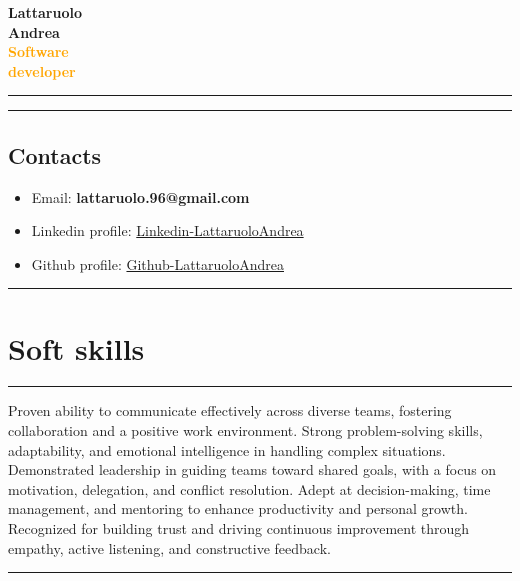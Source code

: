 \documentclass[a4paper,10pt]{article}
\begin{document}
\thispagestyle{empty} %

\noindent
\begin{minipage}[t]{0.25\textwidth}
    \vspace{0.3cm}
    { \LARGE  \textbf{Lattaruolo \\[0.1cm] Andrea \\[0.1cm] \textcolor{orange}{\newline Software \\[0.1cm] developer}}} \\
    \rule{0.6cm}{0.3mm}
\end{minipage}
\hfill
\begin{minipage}[t]{0.75\textwidth}
    \rule{\linewidth}{0.5mm} %
    \subsection*{Contacts}
    \begin{itemize}[leftmargin=1cm]
        \item Email: \textbf{lattaruolo.96@gmail.com}
        \item Linkedin profile: \href{https://github.com/LattaruoloAndrea}{Linkedin-LattaruoloAndrea} 
        \item Github profile: \href{https://github.com/LattaruoloAndrea}{Github-LattaruoloAndrea} 
    \end{itemize}
    \vspace{0.8cm}
    \rule{\linewidth}{0.5mm}
\end{minipage}

\begin{minipage}[t]{0.25\textwidth}
    \section*{Soft skills}
    \vspace{2.8cm} %
    \rule{0.6cm}{0.3mm}
\end{minipage}
\hfill
\begin{minipage}[t]{0.75\textwidth}
    
Proven ability to communicate effectively across diverse teams, fostering collaboration and a positive work environment. Strong problem-solving skills, adaptability, and emotional intelligence in handling complex situations. Demonstrated leadership in guiding teams toward shared goals, with a focus on motivation, delegation, and conflict resolution. Adept at decision-making, time management, and mentoring to enhance productivity and personal growth. Recognized for building trust and driving continuous improvement through empathy, active listening, and constructive feedback.

    \rule{\linewidth}{0.5mm}
\end{minipage}
\end{document}
